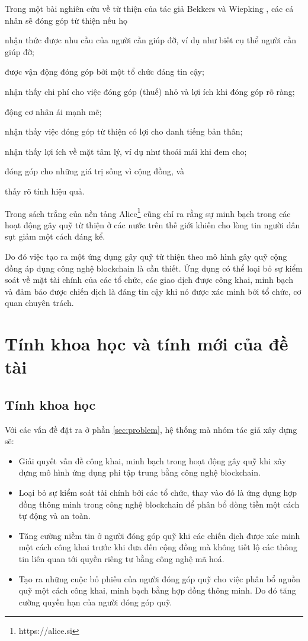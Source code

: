 \documentclass[../main-report.tex]{subfiles}
\begin{document}
Trong một bài nghiên cứu về từ thiện của tác giả Bekkers và Wiepking \cite{bekkers2011literature}, các cá nhân sẽ đóng góp từ thiện nếu họ 
\begin{enumerate*}[label=(\roman*)]
\item nhận thức được nhu cầu của người cần giúp đỡ, ví dụ như biết cụ thể người cần giúp đỡ;
\item được vận động đóng góp bởi một tổ chức đáng tin cậy;
\item nhận thấy chi phí cho việc đóng góp (thuế) nhỏ và lợi ích khi đóng góp rõ ràng;
\item động cơ nhân ái mạnh mẽ;
\item nhận thấy việc đóng góp từ thiện có lợi cho danh tiếng bản thân;
\item nhận thấy lợi ích về mặt tâm lý, ví dụ như thoải mái khi đem cho;
\item đóng góp cho những giá trị sống vì cộng đồng, và
\item thấy rõ tính hiệu quả.
\end{enumerate*}

Trong sách trắng của nền tảng Alice\footnote{https://alice.si} cũng chỉ ra rằng sự minh bạch trong các hoạt động gây quỹ từ thiện ở các nước trên thế giới khiến cho lòng tin người dân sụt giảm một cách đáng kể. \cite{alice}

Do đó việc tạo ra một ứng dụng gây quỹ từ thiện theo mô hình gây quỹ cộng đồng áp dụng công nghệ \gls{blockchain} là cần thiết. Ứng dụng có thể loại bỏ sự kiểm soát về mặt tài chính của các tổ chức, các giao dịch được công khai, minh bạch và đảm bảo được chiến dịch là đáng tin cậy khi nó được xác minh bởi tổ chức, cơ quan chuyên trách.

\section{Tính khoa học và tính mới của đề tài}
\subsection{Tính khoa học}
Với các vấn đề đặt ra ở phần \ref{sec:problem}, hệ thống mà nhóm tác giả xây dựng sẽ:

\begin{itemize}
\item Giải quyết vấn đề công khai, minh bạch trong hoạt động gây quỹ khi xây dựng mô hình ứng dụng phi tập trung bằng công nghệ \gls{blockchain}.
\item Loại bỏ sự kiểm soát tài chính bởi các tổ chức, thay vào đó là ứng dụng hợp đồng thông minh trong công nghệ \gls{blockchain} để phân bổ dòng tiền một cách tự động và an toàn.
\item Tăng cường niềm tin ở người đóng góp quỹ khi các chiến dịch được xác minh một cách công khai trước khi đưa đến cộng đồng mà không tiết lộ các thông tin liên quan tới quyền riêng tư bằng công nghệ mã hoá.
\item Tạo ra những cuộc bỏ phiếu của người đóng góp quỹ cho việc phân bổ nguồn quỹ một cách công khai, minh bạch bằng hợp đồng thông minh. Do đó tăng cường quyền hạn của người đóng góp quỹ.
\end{itemize}
\end{document}
